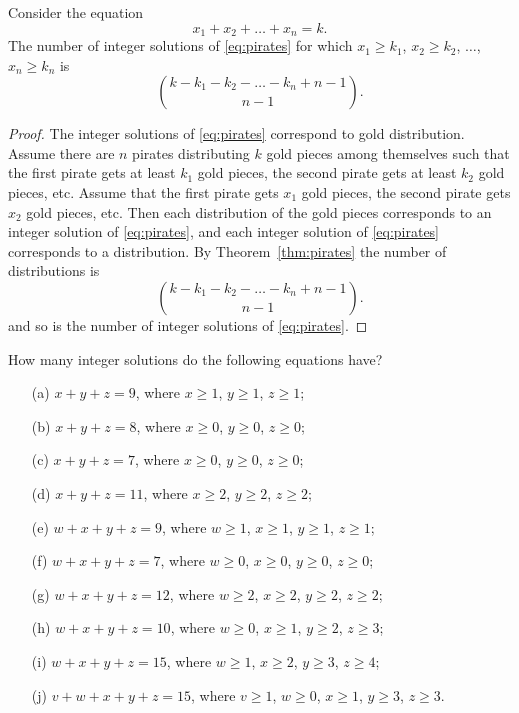 \begin{corollary}\label{cor:pirates}
Consider the equation 
\begin{equation}\label{eq:pirates}
x_1 + x_2 + \dots + x_n = k. 
\end{equation}
The number of integer solutions of \eqref{eq:pirates} for which $x_1 \geq k_1$, $x_2 \geq k_2$, $\dots $, $x_n \geq k_n$ is 
\[
\binom{k-k_1-k_2 - \dots - k_n +n-1}{n-1}.
\] 
\end{corollary}

\begin{proof}
The integer solutions of \eqref{eq:pirates} correspond to gold distribution. 
Assume there are $n$ pirates distributing $k$ gold pieces among themselves such that the first pirate gets at least $k_1$ gold pieces, 
the second pirate gets at least $k_2$ gold pieces, etc. 
Assume that the first pirate gets $x_1$ gold pieces, the second pirate gets $x_2$ gold pieces, etc. 
Then each distribution of the gold pieces corresponds to an integer solution of \eqref{eq:pirates}, 
and each integer solution of \eqref{eq:pirates} corresponds to a distribution. 
By Theorem~\ref{thm:pirates} the number of distributions is 
\[
\binom{k-k_1-k_2 - \dots - k_n +n-1}{n-1}.
\] 
and so is the number of integer solutions of \eqref{eq:pirates}. 
\end{proof}

\begin{exercise}\label{ex:equations1}
How many integer solutions do the following equations have? 
\begin{enumerate}
\item[(a)]
$x + y + z = 9$, where $x\geq 1$, $y\geq 1$, $z \geq 1$; 
\item[(b)]
$x + y + z = 8$, where $x\geq 0$, $y\geq 0$, $z \geq 0$; 
\item[(c)]
$x + y + z = 7$, where $x\geq 0$, $y\geq 0$, $z \geq 0$; 
\item[(d)]
$x + y + z = 11$, where $x\geq 2$, $y\geq 2$, $z \geq 2$; 
\item[(e)]
$w + x + y + z = 9$, where $w \geq 1$, $x\geq 1$, $y\geq 1$, $z \geq 1$; 
\item[(f)]
$w + x + y + z = 7$, where $w \geq 0$, $x\geq 0$, $y\geq 0$, $z \geq 0$; 
\item[(g)]
$w + x + y + z = 12$, where $w \geq 2$, $x\geq 2$, $y\geq 2$, $z \geq 2$; 
\item[(h)]
$w + x + y + z = 10$, where $w \geq 0$, $x\geq 1$, $y\geq 2$, $z \geq 3$; 
\item[(i)]
$w + x + y + z = 15$, where $w \geq 1$, $x\geq 2$, $y\geq 3$, $z \geq 4$; 
\item[(j)]
$v + w + x + y + z = 15$, where $v \geq 1$, $w \geq 0$, $x\geq 1$, $y\geq 3$, $z \geq 3$. 
\end{enumerate}
\end{exercise}

